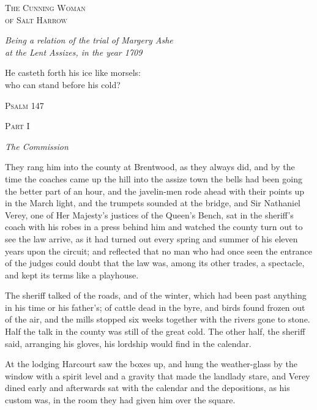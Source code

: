 \documentclass[11pt]{article}
\newcommand{\partheading}[2]{%
  \clearpage
  \vspace*{5\baselineskip}
  {\centering
   {\large\scshape Part #1}\par
   \vspace{0.6\baselineskip}
   {\Large\itshape #2}\par}
  \vspace{2.5\baselineskip}\noindent}
\begin{document}
\thispagestyle{empty}
\vspace*{9\baselineskip}
{\centering
  {\huge\scshape The Cunning Woman\\[0.5\baselineskip] of Salt Harrow\par}
  \vspace{2\baselineskip}
  {\large\itshape Being a relation of the trial of Margery Ashe\\ at the Lent Assizes, in the year 1709\par}
  \vspace{6\baselineskip}
  {\small He casteth forth his ice like morsels:\\ who can stand before his cold?\par}
  \vspace{0.4\baselineskip}
  {\small\scshape Psalm 147\par}
}
\clearpage
\setcounter{page}{1}

\partheading{I}{The Commission}
\noindent They rang him into the county at Brentwood, as they always did, and by the time the coaches came up the hill into the assize town the bells had been going the better part of an hour, and the javelin-men rode ahead with their points up in the March light, and the trumpets sounded at the bridge, and Sir Nathaniel Verey, one of Her Majesty's justices of the Queen's Bench, sat in the sheriff's coach with his robes in a press behind him and watched the county turn out to see the law arrive, as it had turned out every spring and summer of his eleven years upon the circuit; and reflected that no man who had once seen the entrance of the judges could doubt that the law was, among its other trades, a spectacle, and kept its terms like a playhouse.

The sheriff talked of the roads, and of the winter, which had been past anything in his time or his father's; of cattle dead in the byre, and birds found frozen out of the air, and the mills stopped six weeks together with the rivers gone to stone. Half the talk in the county was still of the great cold. The other half, the sheriff said, arranging his gloves, his lordship would find in the calendar.

At the lodging Harcourt saw the boxes up, and hung the weather-glass by the window with a spirit level and a gravity that made the landlady stare, and Verey dined early and afterwards sat with the calendar and the depositions, as his custom was, in the room they had given him over the square.
\end{document}
